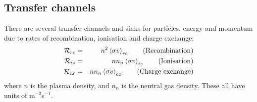 \documentclass[12pt,a4paper]{article}
\begin{document}
\subsection{Transfer channels}

There are several transfer channels and sinks for particles, energy and momentum due to rates
of recombination, ionisation and charge exchange:
\begin{eqnarray*}
  \mathcal{R}_{rc} &=& n^2\left<\sigma v\right>_{rc}   \qquad \mbox{\textrm{(Recombination)}} \\
  \mathcal{R}_{iz} &=&  nn_n\left<\sigma v\right>_{iz} \qquad \mbox{\textrm{(Ionisation)}} \\
  \mathcal{R}_{cx} &=& nn_n\left<\sigma v\right>_{cx} \qquad \mbox{\textrm{(Charge exchange)}}
\end{eqnarray*}
where $n$ is the plasma density, and $n_n$ is the neutral gas density. These all have units of m$^{-3}$s$^{-1}$.
\end{document}
